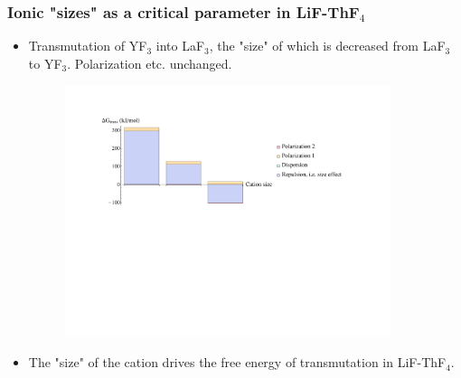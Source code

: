 \documentclass{beamer}
\begin{document}
\begin{frame}
    \frametitle{Ionic "sizes" as a critical parameter in LiF-ThF$_4$}
    \begin{itemize}
        \item Transmutation of YF$_3$ into LaF$_3$, the "size" of which is decreased from LaF$_3$ to YF$_3$. Polarization etc. unchanged.
        \begin{figure}
            \includegraphics[width=0.9\textwidth]{LiFThF4sizeEffectPiechart}
        \end{figure}
        \item The "size" of the cation drives the free energy of transmutation in LiF-ThF$_4$.
    \end{itemize}
\end{frame}
\end{document}
